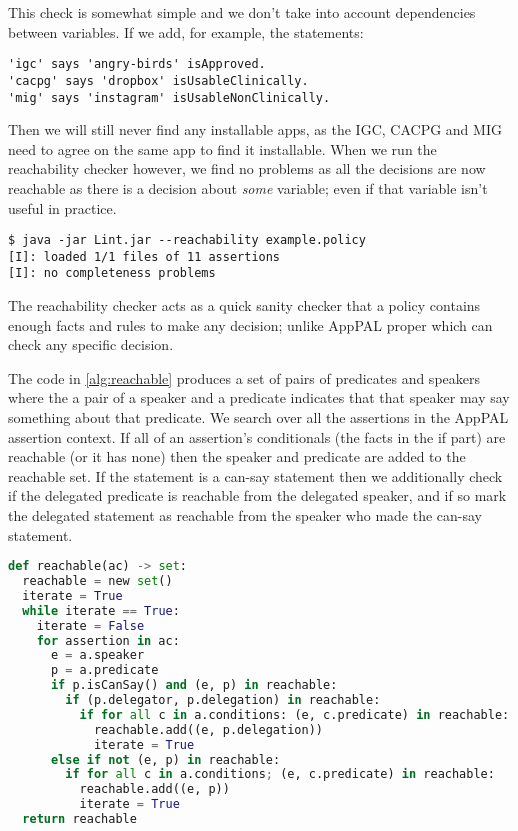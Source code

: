 \documentclass[a4paper]{scrartcl}
\begin{document}
This check is somewhat simple and we don't take into account dependencies
between variables.  If we add, for example, the statements:

\begin{lstlisting}
'igc' says 'angry-birds' isApproved.
'cacpg' says 'dropbox' isUsableClinically.
'mig' says 'instagram' isUsableNonClinically.
\end{lstlisting}

Then we will still never find any installable apps, as the IGC, CACPG and MIG
need to agree on the same app to find it installable.  When we run the
reachability checker however, we find no problems as all the decisions are now
reachable as there is a decision about \emph{some} variable; even if that
variable isn't useful in practice.

\begin{verbatim}
$ java -jar Lint.jar --reachability example.policy
[I]: loaded 1/1 files of 11 assertions
[I]: no completeness problems
\end{verbatim}

The reachability checker acts as a quick sanity checker that a policy contains
enough facts and rules to make any decision; unlike AppPAL proper which can
check any specific decision.

The code in \autoref{alg:reachable} produces a set of pairs of predicates and
speakers where the a pair of a speaker and a predicate indicates that that
speaker may say something about that predicate. We search over all the
assertions in the AppPAL assertion context. If all of an assertion's
conditionals (the facts in the if part) are reachable (or it has none) then the
speaker and predicate are added to the reachable set. If the statement is a
can-say statement then we additionally check if the delegated predicate is
reachable from the delegated speaker, and if so mark the delegated statement as
reachable from the speaker who made the can-say statement.

\begin{lstlisting}[language=Python,float,caption={Procedure for finding all reachable assertions.},label={alg:reachable}]
def reachable(ac) -> set:
  reachable = new set()
  iterate = True
  while iterate == True:
    iterate = False
    for assertion in ac:
      e = a.speaker
      p = a.predicate
      if p.isCanSay() and (e, p) in reachable:
        if (p.delegator, p.delegation) in reachable:
          if for all c in a.conditions: (e, c.predicate) in reachable:
            reachable.add((e, p.delegation))
            iterate = True
      else if not (e, p) in reachable:
        if for all c in a.conditions; (e, c.predicate) in reachable:
          reachable.add((e, p))
          iterate = True
  return reachable
\end{lstlisting}
\end{document}
